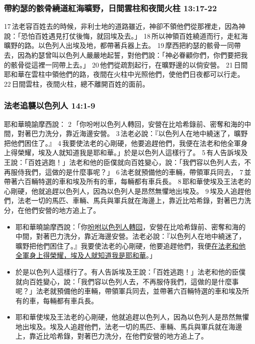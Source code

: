 \subsubsection{帶約瑟的骸骨繞道紅海曠野，日間雲柱和夜間火柱 13:17-22 }
17 法老容百姓去的時候，非利士地的道路雖近，神卻不領他們從那裡走，因為神說：「恐怕百姓遇見打仗後悔，就回埃及去。」 18 所以神領百姓繞道而行，走紅海曠野的路。以色列人出埃及地，都帶著兵器上去。 19 摩西把約瑟的骸骨一同帶去，因為約瑟曾叫以色列人嚴嚴地起誓，對他們說：「神必眷顧你們，你們要把我的骸骨從這裡一同帶上去。」 20 他們從疏割起行，在曠野邊的以倘安營。 21 日間耶和華在雲柱中領他們的路，夜間在火柱中光照他們，使他們日夜都可以行走。 22 日間雲柱，夜間火柱，總不離開百姓的面前。

\subsubsection{法老追襲以色列人 14:1-9}
耶和華曉諭摩西說： 2 「你吩咐以色列人轉回，安營在比哈希錄前、密奪和海的中間，對著巴力洗分，靠近海邊安營。 3 法老必說：『以色列人在地中繞迷了，曠野把他們困住了。』 4 我要使法老的心剛硬，他要追趕他們，我便在法老和他全軍身上得榮耀，埃及人就知道我是耶和華。」於是以色列人這樣行了。 5 有人告訴埃及王說：「百姓逃跑！」法老和他的臣僕就向百姓變心，說：「我們容以色列人去，不再服侍我們，這做的是什麼事呢？」 6 法老就預備他的車輛，帶領軍兵同去， 7 並帶著六百輛特選的車和埃及所有的車，每輛都有車兵長。 8 耶和華使埃及王法老的心剛硬，他就追趕以色列人，因為以色列人是昂然無懼地出埃及。 9 埃及人追趕他們，法老一切的馬匹、車輛、馬兵與軍兵就在海邊上，靠近比哈希錄，對著巴力洗分，在他們安營的地方追上了。

\begin{itemize} 
\itemsep-.35em 
\item 耶和華曉諭摩西說：「你\underline{吩咐以色列人轉回}，安營在比哈希錄前、密奪和海的中間，對著巴力洗分，靠近海邊安營。法老必說：『以色列人在地中繞迷了，曠野把他們困住了。』我要使法老的心剛硬，他要追趕他們，我便\underline{在法老和他全軍身上得榮耀，埃及人就知道我是耶和華}。」
\item 於是以色列人這樣行了。有人告訴埃及王說：「百姓逃跑！」法老和他的臣僕就向百姓變心，說：「我們容以色列人去，不再服侍我們，這做的是什麼事呢？」法老就預備他的車輛，帶領軍兵同去，並帶著六百輛特選的車和埃及所有的車，每輛都有車兵長。
\item 耶和華使埃及王法老的心剛硬，他就追趕以色列人，因為以色列人是昂然無懼地出埃及。埃及人追趕他們，法老一切的馬匹、車輛、馬兵與軍兵就在海邊上，靠近比哈希錄，對著巴力洗分，在他們安營的地方追上了。
\end{itemize}

